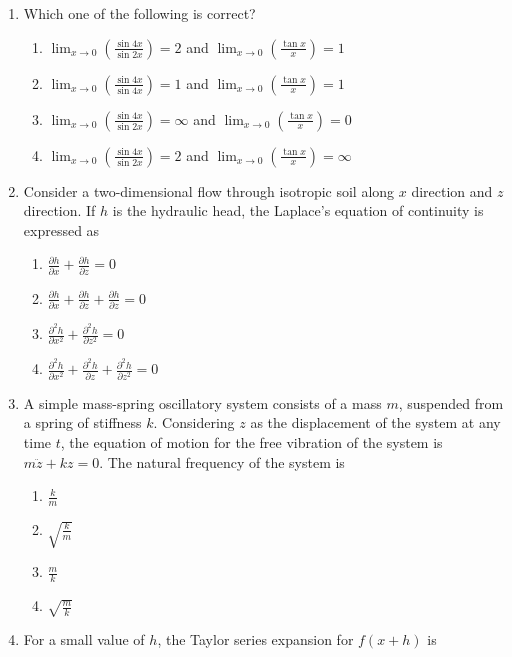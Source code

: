 \documentclass[journal,12pt,onecolumn]{IEEEtran}
\theoremstyle{remark}
\begin{document}
\begin{enumerate}
\item Which one of the following is correct?

\hfill{}
\begin{enumerate}
\item $\lim_{x \to 0} \left(\frac{\sin 4x}{\sin 2x}\right) = 2$ and $\lim_{x \to 0} \left(\frac{\tan x}{x}\right) = 1$
\item $\lim_{x \to 0} \left(\frac{\sin 4x}{\sin 4x}\right) = 1$ and $\lim_{x \to 0} \left(\frac{\tan x}{x}\right) = 1$
\item $\lim_{x \to 0} \left(\frac{\sin 4x}{\sin 2x}\right) = \infty$ and $\lim_{x \to 0} \left(\frac{\tan x}{x}\right) = 0$
\item $\lim_{x \to 0} \left(\frac{\sin 4x}{\sin 2x}\right) = 2$ and $\lim_{x \to 0} \left(\frac{\tan x}{x}\right) = \infty$
\end{enumerate}

\item Consider a two-dimensional flow through isotropic soil along $x$ direction and $z$ direction. If $h$ is the hydraulic head, the Laplace’s equation of continuity is expressed as

\hfill{}
\begin{enumerate}
\item $\frac{\partial h}{\partial x} + \frac{\partial h}{\partial z} = 0$
\item $\frac{\partial h}{\partial x} + \frac{\partial h}{\partial z} + \frac{\partial h}{\partial z} = 0$
\item $\frac{\partial^2 h}{\partial x^2} + \frac{\partial^2 h}{\partial z^2} = 0$
\item $\frac{\partial^2 h}{\partial x^2} + \frac{\partial^2 h}{\partial z} + \frac{\partial^2 h}{\partial z^2} = 0$
\end{enumerate}

\item A simple mass-spring oscillatory system consists of a mass $m$, suspended from a spring of stiffness $k$. Considering $z$ as the displacement of the system at any time $t$, the equation of motion for the free vibration of the system is $m\ddot{z} + kz = 0$. The natural frequency of the system is

\hfill{}
\begin{enumerate}
\item $\frac{k}{m}$
\item $\sqrt{\frac{k}{m}}$
\item $\frac{m}{k}$
\item $\sqrt{\frac{m}{k}}$
\end{enumerate}
\item For a small value of $h$, the Taylor series expansion for $f(x+h)$ is


\end{enumerate}
\end{document}

